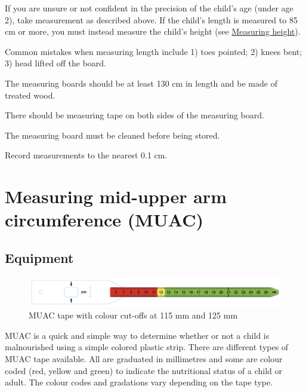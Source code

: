 \documentclass[12pt,]{book}
\theoremstyle{definition}
\theoremstyle{definition}
\theoremstyle{definition}
\theoremstyle{remark}
\let\BeginKnitrBlock\begin \let\EndKnitrBlock\end
\begin{document}
\BeginKnitrBlock{rmdnote}
If you are unsure or not confident in the precision of the child's age
(under age 2), take measurement as described above. If the child's
length is measured to 85 cm or more, you must instead measure the
child's height (see \protect\hyperlink{measuring-height}{Measuring
height}).
\EndKnitrBlock{rmdnote}

\BeginKnitrBlock{rmdwarning}
Common mistakes when measuring length include 1) toes pointed; 2) knees
bent; 3) head lifted off the board.
\EndKnitrBlock{rmdwarning}

\BeginKnitrBlock{rmdremind}
\item 

The measuring boards should be at least 130 cm in length and be made of
treated wood.

\item 

There should be measuring tape on both sides of the measuring board.

\item 

The measuring board must be cleaned before being stored.

\item 

Record measurements to the nearest 0.1 cm.
\EndKnitrBlock{rmdremind}

\hypertarget{muac}{%
\chapter{Measuring mid-upper arm circumference (MUAC)}\label{muac}}

\hypertarget{equipment-2}{%
\section{Equipment}\label{equipment-2}}

\begin{figure}

{\centering \includegraphics[width=13.11in]{images/muac01} 

}

\caption{MUAC tape with colour cut-offs at 115 mm and 125 mm}\label{fig:muac1}
\end{figure}

MUAC is a quick and simple way to determine whether or not a child is
malnourished using a simple colored plastic strip. There are different
types of MUAC tape available. All are graduated in millimetres and some
are colour coded (red, yellow and green) to indicate the nutritional
status of a child or adult. The colour codes and gradations vary
depending on the tape type.
\end{document}
